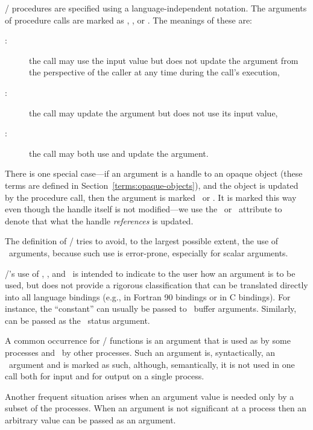\MPI/ procedures are specified using a language-independent notation.
The arguments of procedure calls are marked as \IN, \OUT, or
\INOUT.  The meanings of these are:
\begin{description}
\item[\IN:]
  the call may use the input value but does not update the
  argument from the perspective of the caller at any time during the call's execution,
\item[\OUT:]
  the call may update the argument but does not use its input value,
\item[\INOUT:]
  the call may both use and update the argument.
\end{description}

There is one special case---if an argument is a handle to
an opaque object (these terms are defined in
Section~\ref{terms:opaque-objects}), and the
object is updated by the procedure call, then the argument is marked
\INOUT\ or
\OUT.  It is marked this way even though the handle itself is not
modified---we use the
\INOUT\ or
\OUT\ attribute to denote that what the
handle \emph{references} is updated.

\begin{rationale}
The definition of \MPI/ tries to avoid, to the largest possible extent,
the use of \INOUT\ arguments, because such use is error-prone,
especially for scalar arguments.
\end{rationale}

\MPI/'s use of \IN, \OUT, and \INOUT\ is intended
to indicate to the user how an argument is
to be used, but
does not provide a rigorous classification that can be translated
directly into
all
language bindings (e.g.,  in Fortran 90 bindings
or  in C bindings). For instance, the ``constant''
 can usually be passed to \OUT\ buffer
arguments. Similarly,  can be passed as the
\OUT\ status argument.

A common occurrence for \MPI/ functions is an argument that is used as
\IN{}
by some processes and \OUT\ by other processes. Such
an argument is, syntactically, an \INOUT\ argument and is marked as
such, although, semantically, it is not used in one call both for
input and for output on a single process.

Another frequent situation arises when an argument value is needed only by
a subset of the processes.  When an argument is not significant at a
process then an arbitrary value can be passed as an argument.

